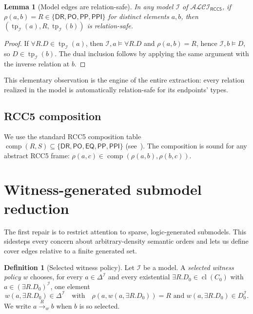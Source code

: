 \documentclass[11pt]{article}
\newtheorem{lemma}[theorem]{Lemma}
\theoremstyle{definition}
\newtheorem{definition}[theorem]{Definition}
\theoremstyle{remark}
\newcommand{\DR}{\mathsf{DR}}
\newcommand{\PO}{\mathsf{PO}}
\newcommand{\PP}{\mathsf{PP}}
\newcommand{\PPI}{\mathsf{PPI}}
\newcommand{\EQ}{\mathsf{EQ}}
\newcommand{\Base}{\{\DR,\PO,\EQ,\PP,\PPI\}}
\newcommand{\BaseEdge}{\{\DR,\PO,\PP,\PPI\}}
\newcommand{\cl}{\operatorname{cl}}
\newcommand{\tp}{\operatorname{tp}}
\newcommand{\comp}{\operatorname{comp}}
\newcommand{\ALCIRCC}[1]{\mathcal{ALCI}_{\mathsf{RCC#1}}}
\begin{document}
\begin{lemma}[Model edges are relation-safe]\label{lem:model-safe}
In any model $\mathcal{I}$ of $\ALCIRCC{5}$, if $\rho(a,b) = R \in
\BaseEdge$ for distinct elements $a,b$, then $(\tp_{\mathcal{I}}(a),
R, \tp_{\mathcal{I}}(b))$ is relation-safe.
\end{lemma}

\begin{proof}
If $\forall R.D \in \tp_{\mathcal{I}}(a)$, then $\mathcal{I},a
\models \forall R.D$ and $\rho(a,b)=R$, hence $\mathcal{I},b
\models D$, so $D \in \tp_{\mathcal{I}}(b)$.  The dual inclusion
follows by applying the same argument with the inverse relation
at $b$.
\end{proof}

This elementary observation is the engine of the entire extraction:
every relation realized in the model is automatically relation-safe
for its endpoints' types.

\subsection{RCC5 composition}

We use the standard RCC5 composition table $\comp(R,S) \subseteq
\Base$ (see~\cite[Table~1]{GPT55Generated}).  The composition is
sound for any abstract RCC5 frame: $\rho(a,c) \in
\comp(\rho(a,b),\rho(b,c))$.


\section{Witness-generated submodel reduction}
\label{sec:witness-generated}

The first repair is to restrict attention to sparse,
logic-generated submodels.  This sidesteps every concern about
arbitrary-density semantic orders and lets us define cover edges
relative to a finite generated set.

\begin{definition}[Selected witness policy]\label{def:witness-policy}
Let $\mathcal{I}$ be a model.  A \emph{selected witness policy} $w$
chooses, for every $a \in \Delta^{\mathcal{I}}$ and every
existential $\exists R.D_0 \in \cl(C_0)$ with $a\in (\exists
R.D_0)^{\mathcal{I}}$, one element
\[
w(a, \exists R.D_0) \in \Delta^{\mathcal{I}}
\quad\text{with}\quad
\rho(a, w(a,\exists R.D_0)) = R \text{ and } w(a,\exists R.D_0) \in
D_0^{\mathcal{I}}.
\]
We write $a \xrightarrow{R}_w b$ when $b$ is so selected.
\end{definition}
\end{document}
